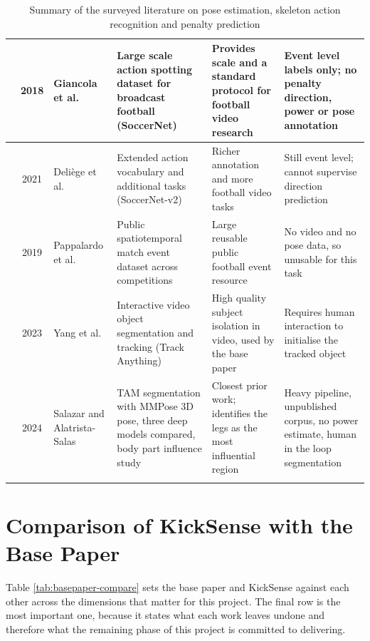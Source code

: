 \begin{longtable}{|c|c|>{\raggedright\arraybackslash}p{2.5cm}|
>{\raggedright\arraybackslash}p{2.9cm}|
>{\raggedright\arraybackslash}p{3.0cm}|
>{\raggedright\arraybackslash}p{3.0cm}|}
\cite{giancola2018} & 2018 & Giancola et al. &
Large scale action spotting dataset for broadcast football (SoccerNet) &
Provides scale and a standard protocol for football video research &
Event level labels only; no penalty direction, power or pose annotation \\ \hline

\cite{deliege2021} & 2021 & Deliège et al. &
Extended action vocabulary and additional tasks (SoccerNet-v2) &
Richer annotation and more football video tasks &
Still event level; cannot supervise direction prediction \\ \hline

\cite{pappalardo2019} & 2019 & Pappalardo et al. &
Public spatiotemporal match event dataset across competitions &
Large reusable public football event resource &
No video and no pose data, so unusable for this task \\ \hline

\cite{yang2023} & 2023 & Yang et al. &
Interactive video object segmentation and tracking (Track Anything) &
High quality subject isolation in video, used by the base paper &
Requires human interaction to initialise the tracked object \\ \hline

\cite{salazar2024} & 2024 & Salazar and Alatrista-Salas &
TAM segmentation with MMPose 3D pose, three deep models compared, body part influence study &
Closest prior work; identifies the legs as the most influential region &
Heavy pipeline, unpublished corpus, no power estimate, human in the loop segmentation \\ \hline

\caption{Summary of the surveyed literature on pose estimation, skeleton action recognition and penalty prediction}
\label{tab:literature-summary}
\end{longtable}
\normalsize
\clearpage

\section{Comparison of KickSense with the Base Paper}

Table \ref{tab:basepaper-compare} sets the base paper and KickSense against each other across the dimensions that matter for this project. The final row is the most important one, because it states what each work leaves undone and therefore what the remaining phase of this project is committed to delivering.

\renewcommand{\arraystretch}{1.35}
\setlength{\tabcolsep}{5pt}
\small

